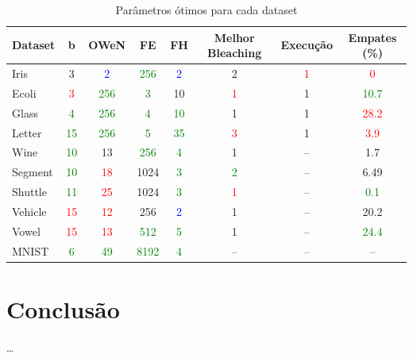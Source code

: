 \documentclass{article}
\begin{document}
{\small
\begin{table}[H]
\caption{Parâmetros ótimos para cada dataset}
\renewcommand{\arraystretch}{1.2}
\begin{center}
\begin{tabular}{lccccccc}
\hline
\textbf{Dataset} & \textbf{b} & \textbf{OWeN} & \textbf{FE} & \textbf{FH} & \textbf{Melhor Bleaching} & \textbf{Execução} & \textbf{Empates (\%)} \\
\hline
Iris & 3 & \textcolor{blue}{2} & \textcolor{green}{256} & \textcolor{blue}{2} & 2 & \textcolor{red}{1} & \textcolor{red}{0} \\
Ecoli & \textcolor{red}{3} & \textcolor{green}{256} & \textcolor{green}{3} & 10 & \textcolor{red}{1} & 1 & \textcolor{green}{10.7} \\
Glass & \textcolor{green}{4} & \textcolor{green}{256} & \textcolor{green}{4} & \textcolor{green}{10} & 1 & 1 & \textcolor{red}{28.2} \\
Letter & \textcolor{green}{15} & \textcolor{green}{256} & \textcolor{green}{5} & \textcolor{green}{35} & \textcolor{red}{3} & 1 & \textcolor{red}{3.9} \\
Wine & \textcolor{green}{10} & 13 & \textcolor{green}{256} & \textcolor{green}{4} & 1 & -- & 1.7 \\
Segment & \textcolor{green}{10} & \textcolor{red}{18} & 1024 & \textcolor{green}{3} & \textcolor{green}{2} & -- & 6.49 \\
Shuttle & \textcolor{green}{11} & \textcolor{red}{25} & 1024 & \textcolor{green}{3} & \textcolor{red}{1} & -- & \textcolor{green}{0.1} \\
Vehicle & \textcolor{red}{15} & \textcolor{red}{12} & 256 & \textcolor{blue}{2} & 1 & -- & 20.2 \\
Vowel & \textcolor{red}{15} & \textcolor{red}{13} & \textcolor{green}{512} & \textcolor{green}{5} & 1 & -- & \textcolor{green}{24.4} \\
MNIST & \textcolor{green}{6} & \textcolor{green}{49} & \textcolor{green}{8192} & \textcolor{green}{4} & -- & -- & -- \\
\hline
\end{tabular}
\end{center}
\end{table}
}

\section{Conclusão}

\ldots



\end{document}
